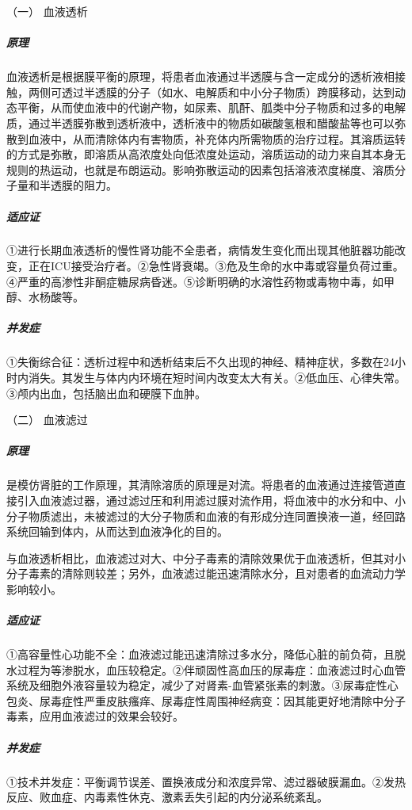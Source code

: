 \hypertarget{text00390.htmlux5cux23CHP16-10-1-3-1}{}
（一） 血液透析

\subparagraph{原理}

血液透析是根据膜平衡的原理，将患者血液通过半透膜与含一定成分的透析液相接触，两侧可透过半透膜的分子（如水、电解质和中小分子物质）跨膜移动，达到动态平衡，从而使血液中的代谢产物，如尿素、肌酐、胍类中分子物质和过多的电解质，通过半透膜弥散到透析液中，透析液中的物质如碳酸氢根和醋酸盐等也可以弥散到血液中，从而清除体内有害物质，补充体内所需物质的治疗过程。其溶质运转的方式是弥散，即溶质从高浓度处向低浓度处运动，溶质运动的动力来自其本身无规则的热运动，也就是布朗运动。影响弥散运动的因素包括溶液浓度梯度、溶质分子量和半透膜的阻力。

\subparagraph{适应证}

①进行长期血液透析的慢性肾功能不全患者，病情发生变化而出现其他脏器功能改变，正在ICU接受治疗者。②急性肾衰竭。③危及生命的水中毒或容量负荷过重。④严重的高渗性非酮症糖尿病昏迷。⑤诊断明确的水溶性药物或毒物中毒，如甲醇、水杨酸等。

\subparagraph{并发症}

①失衡综合征：透析过程中和透析结束后不久出现的神经、精神症状，多数在24小时内消失。其发生与体内内环境在短时间内改变太大有关。②低血压、心律失常。③颅内出血，包括脑出血和硬膜下血肿。

\hypertarget{text00390.htmlux5cux23CHP16-10-1-3-2}{}
（二） 血液滤过

\subparagraph{原理}

是模仿肾脏的工作原理，其清除溶质的原理是对流。将患者的血液通过连接管道直接引入血液滤过器，通过滤过压和利用滤过膜对流作用，将血液中的水分和中、小分子物质滤出，未被滤过的大分子物质和血液的有形成分连同置换液一道，经回路系统回输到体内，从而达到血液净化的目的。

与血液透析相比，血液滤过对大、中分子毒素的清除效果优于血液透析，但其对小分子毒素的清除则较差；另外，血液滤过能迅速清除水分，且对患者的血流动力学影响较小。

\subparagraph{适应证}

①高容量性心功能不全：血液滤过能迅速清除过多水分，降低心脏的前负荷，且脱水过程为等渗脱水，血压较稳定。②伴顽固性高血压的尿毒症：血液滤过时心血管系统及细胞外液容量较为稳定，减少了对肾素-血管紧张素的刺激。③尿毒症性心包炎、尿毒症性严重皮肤瘙痒、尿毒症性周围神经病变：因其能更好地清除中分子毒素，应用血液滤过的效果会较好。

\subparagraph{并发症}

①技术并发症：平衡调节误差、置换液成分和浓度异常、滤过器破膜漏血。②发热反应、败血症、内毒素性休克、激素丢失引起的内分泌系统紊乱。


